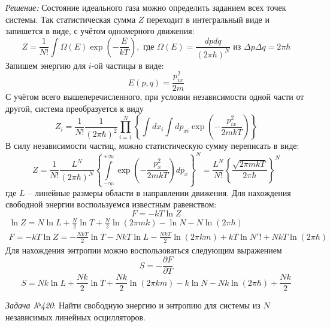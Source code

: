 \documentclass[14pt,final,titlepage,pscyr]{hedwork}
\begin{document}
\emph{Решение:} Состояние идеального газа можно определить заданием всех точек 
системы. Так статистическая сумма \( Z \) переходит в интегральный виде и 
запишется в виде, с учётом одномерного движения:
\[
	Z = \frac{1}{N!} \int \Omega(E) \exp\left( -\frac{E}{kT} \right), 
	\text{ где } \Omega(E) = \frac{dpdq}{(2\pi\hbar)^N} \text{ из }
	\Delta p \Delta q = 2\pi\hbar
\]
Запишем энергию для \( i \)-ой частицы в виде:
\[
	E(p,q) = \frac{p_{ix}^2}{2m}
\]
С учётом всего вышеперечисленного, при условии независимости одной части от 
другой, система преобразуется к виду
\[
	Z_i = \frac{1}{N!}\frac{1}{(2\pi\hbar)^2} \prod\limits_{i=1}^{N}
		\left\{ \int dx_i \int dp_{xi} 
			\exp\left( -\frac{p_{ix}^2}{2mkT} \right) 
		\right\}
\]
В силу независимости частиц, можно статистическую сумму переписать в виде:
\[
	Z = \frac{1}{N!}\frac{L^N}{(2\pi\hbar)^N} 
		\left\{ 
			\int\limits_{-\infty}^{+\infty} 
			\exp\left( -\frac{p_{x}^2}{2mkT} \right) dp_x
		\right\}^N = 
		\frac{L^N}{N!} 
		\left\{
			\frac{\sqrt{2\pi mkT}}{2\pi\hbar} 
		\right\}^N
\]
где \( L \) -- линейные размеры области в направлении движения. Для нахождения 
свободной энергии воспользуемся известным равенством:
\[
	F = -kT\ln Z
\]
\begin{gather}
	\ln Z = N\ln L + \frac{N}{2}\ln T + \frac{N}{2}\ln(2\pi m k) - \ln N\! - 
		N\ln(2\pi\hbar) \nonumber \\
	F = -kT\ln Z = -\frac{NkT}{2}\ln T - NkT\ln L - \frac{NkT}{2}\ln(2\pi km) + 
		kT\ln N'! + NkT\ln(2\pi\hbar) \nonumber
\end{gather}
Для нахождения энтропии можно воспользоваться следующим выражением
\[
	S = -\frac{\partial F}{\partial T}
\]
\[
	S = Nk\ln L + \frac{Nk}{2}\ln T + \frac{Nk}{2}\ln(2\pi km) - k\ln N\! - 
		Nk\ln(2\pi\hbar) + \frac{Nk}{2}
\]

\newpage

\emph{Задача №420}: Найти свободную энергию и энтропию для системы из \( N \) 
независимых линейных осцилляторов.
\end{document}
